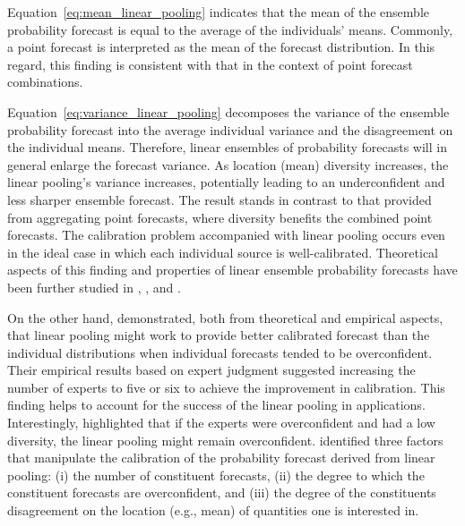 \documentclass[11pt]{article}
\begin{document}
Equation~\eqref{eq:mean_linear_pooling} indicates that the mean of the ensemble probability forecast is equal to the average of the individuals' means. Commonly, a point forecast is interpreted as the mean of the forecast distribution. In this regard, this finding is consistent with that in the context of point forecast combinations.

Equation~\eqref{eq:variance_linear_pooling} decomposes the variance of the ensemble probability forecast into the average individual variance and the disagreement on the individual means. Therefore, linear ensembles of probability forecasts will in general enlarge the forecast variance. As location (mean) diversity increases, the linear pooling's variance increases, potentially leading to an underconfident and less sharper ensemble forecast. The result stands in contrast to that provided from aggregating point forecasts, where diversity benefits the combined point forecasts. The calibration problem accompanied with linear pooling occurs even in the ideal case in which each individual source is well-calibrated. Theoretical aspects of this finding and properties of linear ensemble probability forecasts have been further studied in \cite{Hora2004-fz}, \cite{Ranjan2010-jl}, and \cite{Lichtendahl2013-rt}.

On the other hand, \cite{Hora2004-fz} demonstrated, both from theoretical and empirical aspects, that linear pooling might work to provide better calibrated forecast than the individual distributions when individual forecasts tended to be overconfident. Their empirical results based on expert judgment suggested increasing the number of experts to five or six to achieve the improvement in calibration. This finding helps to account for the success of the linear pooling in applications. Interestingly, \cite{Jose2014-uh} highlighted that if the experts were overconfident and had a low diversity, the linear pooling might remain overconfident. \cite{Lichtendahl2013-rt} identified three factors that manipulate the calibration of the probability forecast derived from linear pooling: (i) the number of constituent forecasts, (ii) the degree to which the constituent forecasts are overconfident, and (iii) the degree of the constituents disagreement on the location (e.g., mean) of quantities one is interested in.
\end{document}
